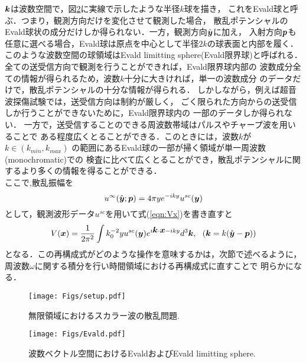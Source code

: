 $\mbox{\boldmath $k$}$は波数空間で，図\ref{fig:Evald}に実線で示したような半径$k$球を描き，
これをEvald球と呼ぶ．つまり，観測方向だけを変化させて観測した場合，
散乱ポテンシャルのEvald球状の成分だけしか得られない．一方，観測方向$\hat{\mbox{\boldmath $y$}}$に加え，
入射方向$\mbox{\boldmath $p$}$も任意に選べる場合，Evald球は原点を中心として半径$2k$の球表面と内部を履く．
このような波数空間の球領域はEvald limitting sphere(Evald限界球)と呼ばれる．
全ての送受信方向で観測を行うことができれば，Evald限界球内部の
波数成分全ての情報が得られるため，波数$k$十分に大きければ，単一の波数成分
のデータだけで，散乱ポテンシャルの十分な情報が得られる．
しかしながら，例えば超音波探傷試験では，送受信方向は制約が厳しく，
ごく限られた方向からの送受信しか行うことができないために，Evald限界球内の
一部のデータしか得られない．
一方で，送受信することのできる周波数帯域はパルスやチャープ波を用いることで
ある程度広くとることができる．このときには，波数$k$が$k\in \left(k_{min},k_{max} \right)$
の範囲にあるEvald球の一部が掃く領域が単一周波数(monochromatic)での
検査に比べて広くとることができ，散乱ポテンシャルに関するより多くの情報を得ることができる．
\\

ここで,散乱振幅を
\begin{equation}
	u^{\infty}(\hat{\mbox{\boldmath $y$}};\mbox{\boldmath $p$})=4\pi ye^{-iky} u^{sc}(\mbox{\boldmath $y$})
	\label{eqn:}
\end{equation}
として，観測波形データ$u^{sc}$を用いて式(\ref{eqn:Vx})を書き直すと
\begin{equation}
	V(\mbox{\boldmath $x$}) =\frac{1}{2\pi^2} \int k_0^{-2} yu^{sc}(\mbox{\boldmath $y$})
	e^{i\mbox{\boldmath $k$}\cdot \mbox{\boldmath $x$}-iky}d^3\mbox{\boldmath $k$}, 
	\ \ (\mbox{\boldmath $k$}=k(\hat{\mbox{\boldmath $y$}}-\mbox{\boldmath $p$}))
	\label{eqn:Vx_usc}
\end{equation}
となる．この再構成式がどのような操作を意味するかは，次節で述べるように，
周波数$\omega$に関する積分を行い時間領域における再構成式に直すことで
明らかになる．
\begin{figure}[h]
	\begin{center}
	\texttt{[image: Figs/setup.pdf]} 
	\end{center}
	\caption{無限領域におけるスカラー波の散乱問題.} 
	\label{fig:}
\end{figure}
\begin{figure}[h]
	\begin{center}
	\texttt{[image: Figs/Evald.pdf]} 
	\end{center}
	\caption{波数ベクトル空間におけるEvaldおよびEvald limitting sphere.} 
	\label{fig:Evald}
\end{figure}
